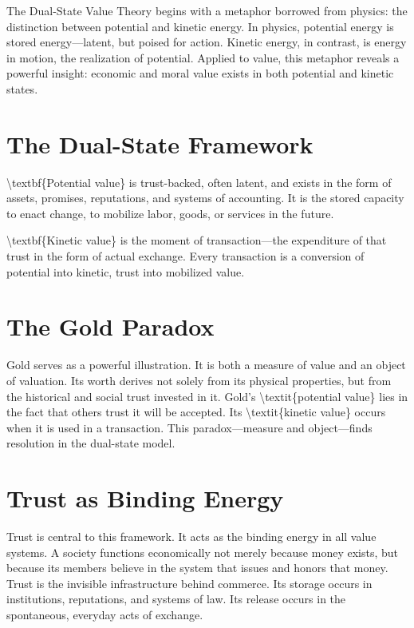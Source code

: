 \documentclass[11pt,oneside]{book}
\begin{document}
The Dual-State Value Theory begins with a metaphor borrowed from physics: the distinction between potential and kinetic energy. In physics, potential energy is stored energy—latent, but poised for action. Kinetic energy, in contrast, is energy in motion, the realization of potential. Applied to value, this metaphor reveals a powerful insight: economic and moral value exists in both potential and kinetic states.

\section{The Dual-State Framework}

\textbackslash textbf\{Potential value\} is trust-backed, often latent, and exists in the form of assets, promises, reputations, and systems of accounting. It is the stored capacity to enact change, to mobilize labor, goods, or services in the future. 

\textbackslash textbf\{Kinetic value\} is the moment of transaction—the expenditure of that trust in the form of actual exchange. Every transaction is a conversion of potential into kinetic, trust into mobilized value.

\section{The Gold Paradox}

Gold serves as a powerful illustration. It is both a measure of value and an object of valuation. Its worth derives not solely from its physical properties, but from the historical and social trust invested in it. Gold's \textbackslash textit\{potential value\} lies in the fact that others trust it will be accepted. Its \textbackslash textit\{kinetic value\} occurs when it is used in a transaction. This paradox—measure and object—finds resolution in the dual-state model.

\section{Trust as Binding Energy}

Trust is central to this framework. It acts as the binding energy in all value systems. A society functions economically not merely because money exists, but because its members believe in the system that issues and honors that money. Trust is the invisible infrastructure behind commerce. Its storage occurs in institutions, reputations, and systems of law. Its release occurs in the spontaneous, everyday acts of exchange.
\end{document}
